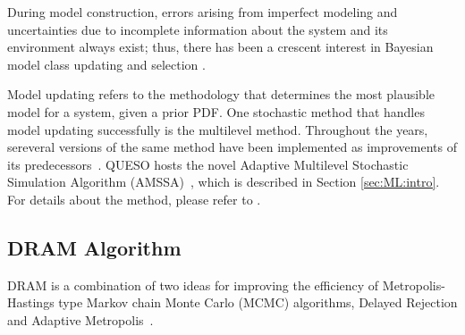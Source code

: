 During model construction, errors arising from imperfect modeling and
uncertainties due to incomplete information about the system and its
environment always exist; thus, there has been a crescent interest in Bayesian
model class updating  and selection
\cite{ChingChen2007,ChOlPr10,CheungPrudencio2012}. 

Model updating refers to the methodology that determines the most plausible
model for a system, given a prior PDF. One stochastic method that handles model
updating successfully is the multilevel method. Throughout the years, sereveral
versions of the same method have been implemented as improvements of its
predecessors~\cite{BeckAu2002,ChingChen2007,CheungPrudencio2012}. QUESO hosts
the novel Adaptive Multilevel Stochastic Simulation Algorithm
(AMSSA)~\cite{CheungPrudencio2012}, which is described in Section
\ref{sec:ML:intro}. For details about the method, please refer to
\cite{CheungPrudencio2012}.



\subsection{DRAM Algorithm}\label{sec:DRAM}

DRAM is a combination of two ideas for improving the efficiency of
Metropolis-Hastings type Markov chain Monte Carlo (MCMC) algorithms, Delayed
Rejection and Adaptive Metropolis~\cite{DRAMtool}. 

